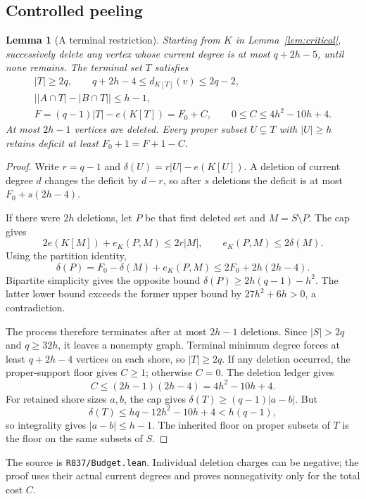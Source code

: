 \documentclass[11pt]{article}
\newtheorem{lemma}[theorem]{Lemma}
\begin{document}
\subsection{Controlled peeling}
\begin{lemma}[A terminal restriction]\label{lem:peel}
Starting from $K$ in Lemma~\ref{lem:critical}, successively delete any vertex whose current degree is at most $q+2h-5$, until none remains. The terminal set $T$ satisfies
\begin{gather*}
 |T|\ge2q,\qquad q+2h-4\le d_{K[T]}(v)\le2q-2,\\
 \bigl||A\cap T|-|B\cap T|\bigr|\le h-1,\\
 F=(q-1)|T|-e(K[T])=F_0+C,\qquad0\le C\le4h^2-10h+4.
\end{gather*}
At most $2h-1$ vertices are deleted. Every proper subset $U\subsetneq T$ with $|U|\ge h$ retains deficit at least $F_0+1=F+1-C$.
\end{lemma}
\begin{proof}
Write $r=q-1$ and $\delta(U)=r|U|-e(K[U])$. A deletion of current degree $d$ changes the deficit by $d-r$, so after $s$ deletions the deficit is at most $F_0+s(2h-4)$.

If there were $2h$ deletions, let $P$ be that first deleted set and $M=S\setminus P$. The cap gives
\[
 2e(K[M])+e_K(P,M)\le2r|M|,
 \qquad e_K(P,M)\le2\delta(M).
\]
Using the partition identity,
\[
 \delta(P)=F_0-\delta(M)+e_K(P,M)
 \le2F_0+2h(2h-4).
\]
Bipartite simplicity gives the opposite bound $\delta(P)\ge2h(q-1)-h^2$. The latter lower bound exceeds the former upper bound by $27h^2+6h>0$, a contradiction.

The process therefore terminates after at most $2h-1$ deletions. Since $|S|>2q$ and $q\ge32h$, it leaves a nonempty graph. Terminal minimum degree forces at least $q+2h-4$ vertices on each shore, so $|T|\ge2q$. If any deletion occurred, the proper-support floor gives $C\ge1$; otherwise $C=0$. The deletion ledger gives
\[
 C\le(2h-1)(2h-4)=4h^2-10h+4.
\]
For retained shore sizes $a,b$, the cap gives $\delta(T)\ge(q-1)|a-b|$. But
\[
 \delta(T)\le hq-12h^2-10h+4<h(q-1),
\]
so integrality gives $|a-b|\le h-1$. The inherited floor on proper subsets of $T$ is the floor on the same subsets of $S$.
\end{proof}
The source is \nolinkurl{R837/Budget.lean}. Individual deletion charges can be negative; the proof uses their actual current degrees and proves nonnegativity only for the total cost $C$.
\end{document}
